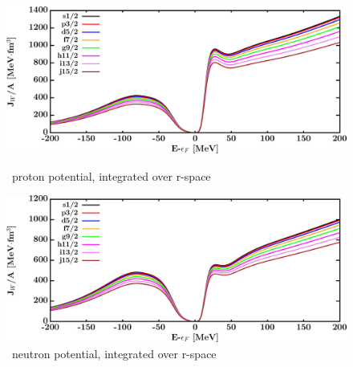 \begin{figure}[H]
    \centering
    \begin{minipage}{0.45\textwidth}
        \centering
        \includegraphics[width=1.0\textwidth]{figures/pb208_protonVolumeIntegrals.png}
        \caption{\pbEight\ proton potential, integrated over r-space}
        \label{DOMFitData_pb208_proton_potentialIntegral}
    \end{minipage}\hfill
    \begin{minipage}{0.45\textwidth}
        \centering
        \includegraphics[width=1.0\textwidth]{figures/pb208_neutronVolumeIntegrals.png}
        \caption{\pbEight\ neutron potential, integrated over r-space}
        \label{DOMFitData_pb208_neutron_potentialIntegral}
    \end{minipage}
\end{figure}

\afterpage{\clearpage}

